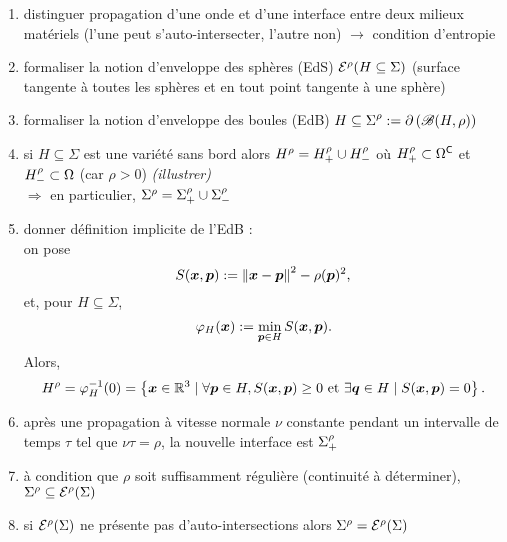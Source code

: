 \par\bigskip
\begin{enumerate}
	\item distinguer propagation d'une onde et d'une interface entre deux milieux matériels (l'une peut s'auto-intersecter, l'autre non) $\to$ condition d'entropie
	\item formaliser la notion d'enveloppe des sphères (EdS) ${\mathcal{E}}^{\rho}({H \subseteq \Sigma})$ (surface tangente à toutes les sphères et en tout point tangente à une sphère)
	\item formaliser la notion d'enveloppe des boules (EdB) ${H \subseteq \Sigma}^{\rho} := \partial  \left( \mathscr{B}(H,\rho) \right)$
	\item si $H \subseteq \Sigma$ est une variété sans bord alors ${H}^{\rho}  = {H}_{+}^{\rho} \cup {H}_{-}^{\rho}$ où ${H}_{+}^{\rho} \subset \Omega^\mathsf{C}$ et ${H}_{-}^{\rho} \subset \Omega$ (car $\rho > 0$) \textit{(illustrer)}\\
	$\Rightarrow$ en particulier, ${\Sigma}^{\rho}  = {\Sigma}_{+}^{\rho} \cup {\Sigma}_{-}^{\rho}$
	
	
	\item donner définition implicite de l'EdB :\\
	on pose 
	\[
		S(\bm{x}, \bm{p}) := \left\| {\bm{x} - \bm{p}} \right\|^2 - \rho(\bm{p})^2,
	\]
	et, pour $H \subseteq \Sigma$, 
	\[
		\varphi_{H}(\bm{x}) := \min_{\bm{p} \in H} S(\bm{x}, \bm{p}).
	\]
	Alors,
	\[ 
		{H}^{\rho} 
		= \varphi_{H}^{-1}(0)
		= 
		\left\{
			\bm{x} \in \mathbb{R}^3 \mid \forall \bm{p} \in H, S(\bm{x}, \bm{p}) \geq 0
			\text{ et } \exists \bm{q} \in H \mid S(\bm{x}, \bm{p}) = 0
		\right\}.
	\]
	\item après une propagation à vitesse normale $\nu$ constante pendant un intervalle de temps $\tau$ tel que $\nu \tau = \rho$, la nouvelle interface est ${\Sigma}_{+}^{\rho}$
	\item à condition que $\rho$ soit suffisamment régulière (continuité à déterminer), ${\Sigma}^{\rho} \subseteq {\mathcal{E}}^{\rho}({\Sigma})$
	\item si ${\mathcal{E}}^{\rho}({\Sigma})$ ne présente pas d'auto-intersections alors ${\Sigma}^{\rho} = {\mathcal{E}}^{\rho}({\Sigma})$
\end{enumerate}


